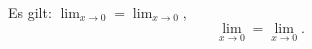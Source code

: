 Es gilt: $\lim_{x \to 0} = {\displaystyle \lim_{x \to 0}}$,
\[ \lim_{x \to 0} = {\textstyle \lim_{x \to 0}}. \]
